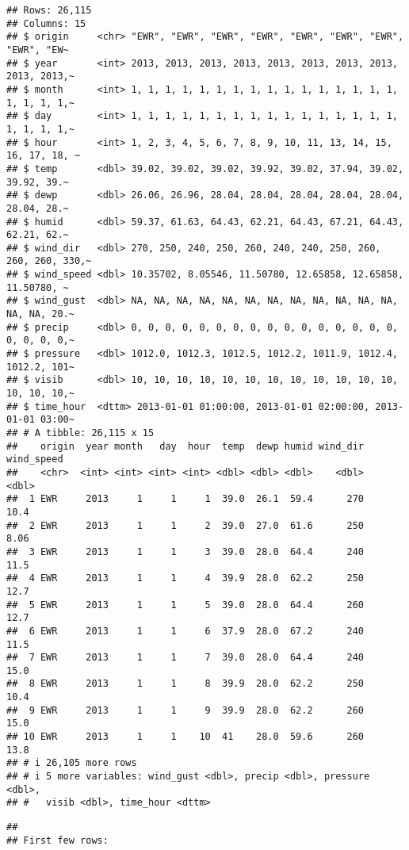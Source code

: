 \documentclass[
]{article}
\begin{document}
\begin{verbatim}
## Rows: 26,115
## Columns: 15
## $ origin     <chr> "EWR", "EWR", "EWR", "EWR", "EWR", "EWR", "EWR", "EWR", "EW~
## $ year       <int> 2013, 2013, 2013, 2013, 2013, 2013, 2013, 2013, 2013, 2013,~
## $ month      <int> 1, 1, 1, 1, 1, 1, 1, 1, 1, 1, 1, 1, 1, 1, 1, 1, 1, 1, 1, 1,~
## $ day        <int> 1, 1, 1, 1, 1, 1, 1, 1, 1, 1, 1, 1, 1, 1, 1, 1, 1, 1, 1, 1,~
## $ hour       <int> 1, 2, 3, 4, 5, 6, 7, 8, 9, 10, 11, 13, 14, 15, 16, 17, 18, ~
## $ temp       <dbl> 39.02, 39.02, 39.02, 39.92, 39.02, 37.94, 39.02, 39.92, 39.~
## $ dewp       <dbl> 26.06, 26.96, 28.04, 28.04, 28.04, 28.04, 28.04, 28.04, 28.~
## $ humid      <dbl> 59.37, 61.63, 64.43, 62.21, 64.43, 67.21, 64.43, 62.21, 62.~
## $ wind_dir   <dbl> 270, 250, 240, 250, 260, 240, 240, 250, 260, 260, 260, 330,~
## $ wind_speed <dbl> 10.35702, 8.05546, 11.50780, 12.65858, 12.65858, 11.50780, ~
## $ wind_gust  <dbl> NA, NA, NA, NA, NA, NA, NA, NA, NA, NA, NA, NA, NA, NA, 20.~
## $ precip     <dbl> 0, 0, 0, 0, 0, 0, 0, 0, 0, 0, 0, 0, 0, 0, 0, 0, 0, 0, 0, 0,~
## $ pressure   <dbl> 1012.0, 1012.3, 1012.5, 1012.2, 1011.9, 1012.4, 1012.2, 101~
## $ visib      <dbl> 10, 10, 10, 10, 10, 10, 10, 10, 10, 10, 10, 10, 10, 10, 10,~
## $ time_hour  <dttm> 2013-01-01 01:00:00, 2013-01-01 02:00:00, 2013-01-01 03:00~
## # A tibble: 26,115 x 15
##    origin  year month   day  hour  temp  dewp humid wind_dir wind_speed
##    <chr>  <int> <int> <int> <int> <dbl> <dbl> <dbl>    <dbl>      <dbl>
##  1 EWR     2013     1     1     1  39.0  26.1  59.4      270      10.4 
##  2 EWR     2013     1     1     2  39.0  27.0  61.6      250       8.06
##  3 EWR     2013     1     1     3  39.0  28.0  64.4      240      11.5 
##  4 EWR     2013     1     1     4  39.9  28.0  62.2      250      12.7 
##  5 EWR     2013     1     1     5  39.0  28.0  64.4      260      12.7 
##  6 EWR     2013     1     1     6  37.9  28.0  67.2      240      11.5 
##  7 EWR     2013     1     1     7  39.0  28.0  64.4      240      15.0 
##  8 EWR     2013     1     1     8  39.9  28.0  62.2      250      10.4 
##  9 EWR     2013     1     1     9  39.9  28.0  62.2      260      15.0 
## 10 EWR     2013     1     1    10  41    28.0  59.6      260      13.8 
## # i 26,105 more rows
## # i 5 more variables: wind_gust <dbl>, precip <dbl>, pressure <dbl>,
## #   visib <dbl>, time_hour <dttm>
\end{verbatim}

\begin{verbatim}
## 
## First few rows:
\end{verbatim}
\end{document}
